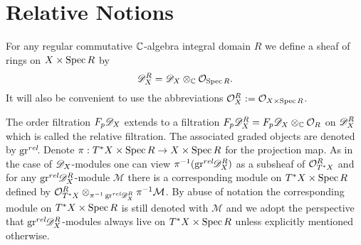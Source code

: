 \section{Relative Notions}
For any regular commutative $\mathbb{C}$-algebra integral domain $R$ we define a sheaf of rings on $X\times \operatorname{Spec} R$ by
$$\mathscr{D}_{X}^R = \mathscr{D}_X \otimes_{\mathbb{C}} \mathcal{O}_{\operatorname{Spec} R}.$$
It will also be convenient to use the abbreviations $\mathcal{O}_{X}^R := \mathcal{O}_{X \times \operatorname{Spec} R}$.

The order filtration $F_p\mathscr{D}_X$ extends to a filtration $F_p\mathscr{D}^R_X = F_p\mathscr{D}_X \otimes_{\mathbb{C}} \mathcal{O}_R$ on $\mathscr{D}^R_X$ which is called the relative filtration.
The associated graded objects are denoted by $\operatorname{gr}^{rel}\mkern-5mu$. Denote $\pi:T^*X\times \operatorname{Spec} R \to X\times \operatorname{Spec} R$ for the projection map.
As in the case of $\mathscr{D}_X$-modules one can view $\pi^{-1}(\operatorname{gr}^{rel}\mkern-5mu\mathscr{D}_X^R)$ as a subsheaf of $\mathcal{O}_{T^*X}^R$ and for any $\operatorname{gr}^{rel}\mkern-5mu\mathscr{D}_X^R$-module $\mathcal{M}$ there is a corresponding module on $T^*X\times \operatorname{Spec} R$ defined by $\mathcal{O}_{T^*X}^R\otimes_{\pi^{-1}\operatorname{gr}^{rel}\mkern-5mu\mathscr{D}_X^R}\pi^{-1}\mathcal{M}$.
By abuse of notation the corresponding module on $T^*X\times \operatorname{Spec} R$ is still denoted with $\mathcal{M}$ and we adopt the perspective that $\operatorname{gr}^{rel}\mkern-5mu\mathscr{D}_X^R$-modules always live on $T^*X\times \operatorname{Spec} R$ unless explicitly mentioned otherwise.

